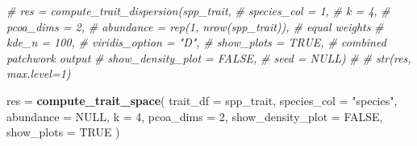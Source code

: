 \documentclass[
]{article}
\newenvironment{Shaded}{\begin{snugshade}}{\end{snugshade}}
\newcommand{\AttributeTok}[1]{\textcolor[rgb]{0.13,0.29,0.53}{#1}}
\newcommand{\CommentTok}[1]{\textcolor[rgb]{0.56,0.35,0.01}{\textit{#1}}}
\newcommand{\ConstantTok}[1]{\textcolor[rgb]{0.56,0.35,0.01}{#1}}
\newcommand{\DecValTok}[1]{\textcolor[rgb]{0.00,0.00,0.81}{#1}}
\newcommand{\FunctionTok}[1]{\textcolor[rgb]{0.13,0.29,0.53}{\textbf{#1}}}
\newcommand{\NormalTok}[1]{#1}
\newcommand{\OtherTok}[1]{\textcolor[rgb]{0.56,0.35,0.01}{#1}}
\newcommand{\StringTok}[1]{\textcolor[rgb]{0.31,0.60,0.02}{#1}}
\begin{document}
\begin{Shaded}
\begin{Highlighting}[]
\CommentTok{\# res = compute\_trait\_dispersion(spp\_trait,}
\CommentTok{\#                                species\_col = 1,}
\CommentTok{\#                                k = 4,}
\CommentTok{\#                                pcoa\_dims = 2,}
\CommentTok{\#                                abundance = rep(1, nrow(spp\_trait)),  \# equal weights}
\CommentTok{\#                                kde\_n = 100,}
\CommentTok{\#                                viridis\_option = "D",}
\CommentTok{\#                                show\_plots = TRUE,                    \# combined patchwork output}
\CommentTok{\#                                show\_density\_plot = FALSE,}
\CommentTok{\#                                seed = NULL)}
\CommentTok{\# }
\CommentTok{\# str(res, max.level=1)}

\NormalTok{res }\OtherTok{=} \FunctionTok{compute\_trait\_space}\NormalTok{(}
  \AttributeTok{trait\_df =}\NormalTok{ spp\_trait,}
  \AttributeTok{species\_col =} \StringTok{"species"}\NormalTok{, }
  \AttributeTok{abundance =} \ConstantTok{NULL}\NormalTok{,}
  \AttributeTok{k =} \DecValTok{4}\NormalTok{, }
  \AttributeTok{pcoa\_dims =} \DecValTok{2}\NormalTok{, }
  \AttributeTok{show\_density\_plot =} \ConstantTok{FALSE}\NormalTok{,}
  \AttributeTok{show\_plots =} \ConstantTok{TRUE}
\NormalTok{)}
\end{Highlighting}
\end{Shaded}
\end{document}
